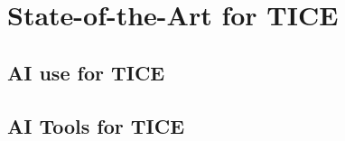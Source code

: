 \chapter{State-of-the-Art for TICE}

\lipsum[1-3]

\section{AI use for TICE}

\lipsum[1-3]

\section{AI Tools for TICE}

\lipsum[1-3]
